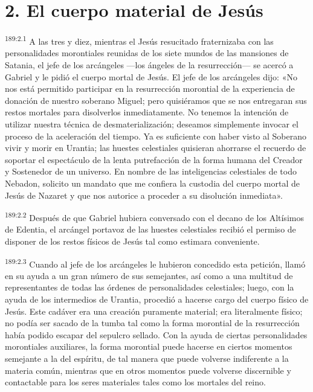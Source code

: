 \section*{2. El cuerpo material de Jesús}
\par 
\textsuperscript{189:2.1} A las tres y diez, mientras el Jesús resucitado fraternizaba con las personalidades morontiales reunidas de los siete mundos de las mansiones de Satania, el jefe de los arcángeles ---los ángeles de la resurrección--- se acercó a Gabriel y le pidió el cuerpo mortal de Jesús. El jefe de los arcángeles dijo: «No nos está permitido participar en la resurrección morontial de la experiencia de donación de nuestro soberano Miguel; pero quisiéramos que se nos entregaran sus restos mortales para disolverlos inmediatamente. No tenemos la intención de utilizar nuestra técnica de desmaterialización; deseamos simplemente invocar el proceso de la aceleración del tiempo. Ya es suficiente con haber visto al Soberano vivir y morir en Urantia; las huestes celestiales quisieran ahorrarse el recuerdo de soportar el espectáculo de la lenta putrefacción de la forma humana del Creador y Sostenedor de un universo. En nombre de las inteligencias celestiales de todo Nebadon, solicito un mandato que me confiera la custodia del cuerpo mortal de Jesús de Nazaret y que nos autorice a proceder a su disolución inmediata».

\par 
\textsuperscript{189:2.2} Después de que Gabriel hubiera conversado con el decano de los Altísimos de Edentia, el arcángel portavoz de las huestes celestiales recibió el permiso de disponer de los restos físicos de Jesús tal como estimara conveniente.

\par 
\textsuperscript{189:2.3} Cuando al jefe de los arcángeles le hubieron concedido esta petición, llamó en su ayuda a un gran número de sus semejantes, así como a una multitud de representantes de todas las órdenes de personalidades celestiales; luego, con la ayuda de los intermedios de Urantia, procedió a hacerse cargo del cuerpo físico de Jesús. Este cadáver era una creación puramente material; era literalmente físico; no podía ser sacado de la tumba tal como la forma morontial de la resurrección había podido escapar del sepulcro sellado. Con la ayuda de ciertas personalidades morontiales auxiliares, la forma morontial puede hacerse en ciertos momentos semejante a la del espíritu, de tal manera que puede volverse indiferente a la materia común, mientras que en otros momentos puede volverse discernible y contactable para los seres materiales tales como los mortales del reino.

